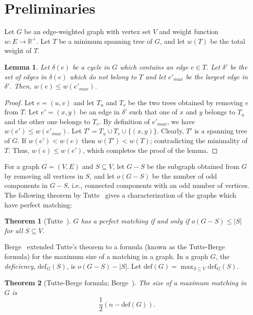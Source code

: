 \documentclass[11pt,a4paper]{article}
\newtheorem{lemma}{Lemma}
\newtheorem{theorem}{Theorem}
\begin{document}
\section{Preliminaries}
\label{preliminaries}
Let $G$ be an edge-weighted graph with vertex set $V$ and weight function $w:E\rightarrow\mathbb{R^+}$. Let $T$ be a minimum spanning tree of $G$, and let $w(T)$ be the total weight of $T$. 

\begin{lemma}
\label{not-mst-edge}
Let $\delta(e)$ be a cycle in $G$ which contains an edge $e\in T$. Let $\delta'$ be the set of edges in $\delta(e)$ which do not belong to $T$ and let $e'_{max}$ be the largest edge in $\delta'$. Then, $w(e)\le w(e'_{max})$.
\end{lemma}

\begin{proof}
Let $e=(u,v)$ and let $T_u$ and $T_v$ be the two trees obtained by removing $e$ from $T$. Let $e'=(x,y)$ be an edge in $\delta'$ such that one of $x$ and $y$ belongs to $T_u$ and the other one belongs to $T_v$. By definition of $e'_{max}$, we have $w(e')\le w(e'_{max})$. Let $T'=T_u\cup T_v \cup\{(x,y)\}$. Clearly, $T'$ is a spanning tree of $G$. If $w(e')<w(e)$ then $w(T')<w(T)$; contradicting the minimality of $T$. Thus, $w(e)\le w(e')$, which completes the proof of the lemma. 
\end{proof}
 
For a graph $G=(V,E)$ and $S\subseteq V$, let $G-S$ be the subgraph obtained from $G$ by removing all vertices in $S$, and let $o(G-S)$ be the number of odd components in $G-S$, i.e., connected components with an odd number of vertices. The following theorem by Tutte~\cite{Tutte1947} gives a characterization of the graphs which have perfect matching: 

\begin{theorem}[Tutte~\cite{Tutte1947}] 
\label{Tutte} 
$G$ has a perfect matching if and only if $o(G-S)\le |S|$ for all $S\subseteq V$.
\end{theorem}

Berge~\cite{Berge1958} extended Tutte’s theorem to a formula (known as the Tutte-Berge formula) for the maximum size of a matching in a graph. In a graph $G$, the {\em deficiency}, $\text{def}_G(S)$, is $o(G-S)-|S|$. Let $\text{def}(G)=\max_{S\subseteq V}{\text{def}_G(S)}$.

\begin{theorem}[Tutte-Berge formula; Berge~\cite{Berge1958}] 
\label{Berge} 
The size of a maximum matching in $G$ is $$\frac{1}{2}(n-\mathrm{def}(G)).$$
\end{theorem}
\end{document}
